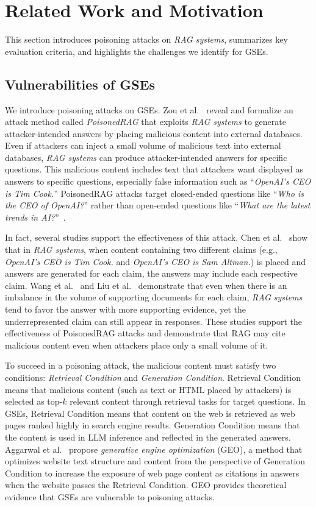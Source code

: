 \section{Related Work and Motivation}
\label{sec:related}
This section introduces poisoning attacks on \emph{RAG systems}, summarizes key evaluation criteria, and highlights the challenges we identify for GSEs.

\subsection{Vulnerabilities of GSEs}
We introduce poisoning attacks on GSEs.
Zou et al.~\cite{poisonedrag-arxiv24} reveal and formalize an attack method called \emph{PoisonedRAG} that exploits \emph{RAG systems} to generate attacker-intended answers by placing malicious content into external databases.
Even if attackers can inject a small volume of malicious text into external databases, \emph{RAG systems} can produce attacker-intended answers for specific questions.
This malicious content includes text that attackers want displayed as answers to specific questions, especially false information such as ``\textit{OpenAI's CEO is Tim Cook.}''
PoisonedRAG attacks target closed-ended questions like ``\textit{Who is the CEO of OpenAI?}'' rather than open-ended questions like ``\textit{What are the latest trends in AI?}''~\cite{poisonedrag-arxiv24}.

In fact, several studies support the effectiveness of this attack.
Chen et al.~\cite{chen2022rich} show that in \emph{RAG systems}, when content containing two different claims (e.g., \textit{OpenAI's CEO is Tim Cook.} and \textit{OpenAI's CEO is Sam Altman.}) is placed and answers are generated for each claim, the answers may include each respective claim.
Wang et al.~\cite{wang2025ragconflictevidence} and Liu et al.~\cite{liu2025conflicts} demonstrate that even when there is an imbalance in the volume of supporting documents for each claim, \emph{RAG systems} tend to favor the answer with more supporting evidence, yet the underrepresented claim can still appear in responses.
These studies support the effectiveness of PoisonedRAG attacks and demonstrate that RAG may cite malicious content even when attackers place only a small volume of it.

To succeed in a poisoning attack, the malicious content must satisfy two conditions: \emph{Retrieval Condition} and \emph{Generation Condition}.
Retrieval Condition means that malicious content (such as text or HTML placed by attackers) is selected as top-$ k $ relevant content through retrieval tasks for target questions.
In GSEs, Retrieval Condition means that content on the web is retrieved as web pages ranked highly in search engine results.
Generation Condition means that the content is used in LLM inference and reflected in the generated answers.
Aggarwal et al.~\cite{geo-apmr+24} propose \emph{generative engine optimization} (GEO), a method that optimizes website text structure and content from the perspective of Generation Condition to increase the exposure of web page content as citations in answers when the website passes the Retrieval Condition.
GEO provides theoretical evidence that GSEs are vulnerable to poisoning attacks.

